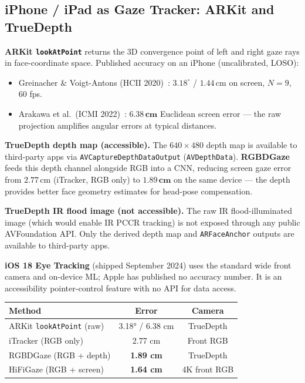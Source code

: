 \documentclass[11pt,a4paper]{article}
\begin{document}
\subsection{iPhone / iPad as Gaze Tracker: ARKit and TrueDepth}
\label{subsec:arkit}

\textbf{ARKit \texttt{lookAtPoint}} returns the 3D convergence point of left and right
gaze rays in face-coordinate space.
Published accuracy on an iPhone (uncalibrated, LOSO):
\begin{itemize}
  \item Greinacher \& Voigt-Antons (HCII 2020)~\cite{greinacher2020arkit}:
        $\mathbf{3.18^\circ}$ / $1.44\,\text{cm}$ on screen, $N=9$, 60 fps.
  \item Arakawa et al.\ (ICMI 2022)~\cite{arakawa2022rgbd}:
        $\mathbf{6.38\,\text{cm}}$ Euclidean screen error --- the raw projection
        amplifies angular errors at typical distances.
\end{itemize}

\textbf{TrueDepth depth map (accessible).}
The $640\times480$ depth map is available to third-party apps via
\texttt{AVCaptureDepthDataOutput} (\texttt{AVDepthData}).
\textbf{RGBDGaze}~\cite{arakawa2022rgbd} feeds this depth channel alongside RGB into a CNN,
reducing screen gaze error from $2.77\,\text{cm}$ (iTracker, RGB only) to
$\mathbf{1.89\,\text{cm}}$ on the same device --- the depth provides better
face geometry estimates for head-pose compensation.

\textbf{TrueDepth IR flood image (not accessible).}
The raw IR flood-illuminated image (which would enable IR PCCR tracking)
is not exposed through any public AVFoundation API.
Only the derived depth map and \texttt{ARFaceAnchor} outputs are available to third-party apps.

\textbf{iOS 18 Eye Tracking} (shipped September 2024) uses the standard wide front camera
and on-device ML; Apple has published no accuracy number.
It is an accessibility pointer-control feature with no API for data access.

\begin{center}
\begin{tabular}{lcc}
\hline
\textbf{Method} & \textbf{Error} & \textbf{Camera} \\
\hline
ARKit \texttt{lookAtPoint} (raw) & 3.18° / 6.38 cm & TrueDepth \\
iTracker (RGB only) & 2.77 cm & Front RGB \\
RGBDGaze (RGB + depth) & \textbf{1.89 cm} & TrueDepth \\
HiFiGaze (RGB + screen) & \textbf{1.64 cm} & 4K front RGB \\
\hline
\end{tabular}
\end{center}
\end{document}
